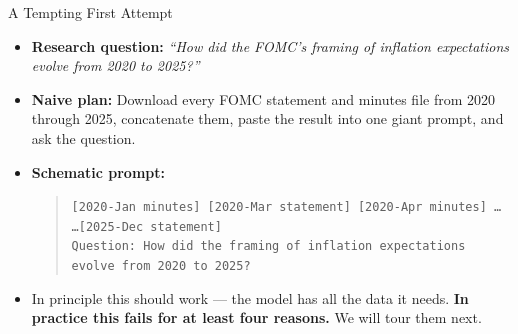 \documentclass[10pt,english,aspectratio=169]{beamer}
\begin{document}
\begin{frame}{A Tempting First Attempt}
\begin{itemize}
\item \textbf{Research question:} \emph{``How did the FOMC's framing of inflation expectations evolve from 2020 to 2025?''}

\medskip
\item \textbf{Naive plan:} Download every FOMC statement and minutes file from 2020 through 2025, concatenate them, paste the result into one giant prompt, and ask the question.

\medskip
\item \textbf{Schematic prompt:}
\begin{quote}
\small
\texttt{[2020-Jan minutes] [2020-Mar statement] [2020-Apr minutes] \dots\\
\dots [2025-Dec statement]\\
Question: How did the framing of inflation expectations evolve from 2020 to 2025?}
\end{quote}

\medskip
\item In principle this should work --- the model has all the data it needs. \textbf{In practice this fails for at least four reasons.} We will tour them next.
\end{itemize}
\end{frame}
\end{document}
